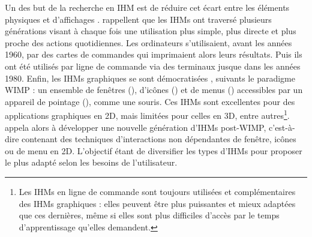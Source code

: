 Un des but de la recherche en IHM est de réduire cet écart entre les éléments physiques et d'affichages \citep{VanDam1997}. \cite{Jacob2008} rappellent que les IHMs ont traversé plusieurs générations visant à chaque fois une utilisation plus simple, plus directe et plus proche des actions quotidiennes. Les ordinateurs s'utilisaient, avant les années 1960, par des cartes de commandes qui imprimaient alors leurs résultats. Puis ils ont été utilisés par ligne de commande via des terminaux jusque dans les années 1980. Enfin, les IHMs graphiques se sont démocratisées , suivants le paradigme WIMP : un ensemble de fenêtres (), d'icônes () et de menus () accessibles par un appareil de pointage (), comme une souris. Ces IHMs sont excellentes pour des applications graphiques en 2D, mais limitées pour celles en 3D, entre autres\footnote{Les IHMs en ligne de commande sont toujours utilisées et complémentaires des IHMs graphiques : elles peuvent être plus puissantes et mieux adaptées que ces dernières, même si elles sont plus difficiles d'accès par le temps d'apprentissage qu'elles demandent.}. \cite{VanDam1997} appela alors à développer une nouvelle génération d'IHMs post-WIMP, c'est-à-dire contenant des techniques d'interactions non dépendantes de fenêtre, icônes ou de menu en 2D. L'objectif étant de diversifier les types d'IHMs pour proposer le plus adapté selon les besoins de l'utilisateur.



